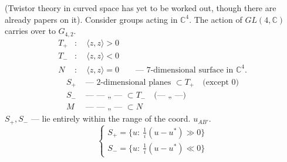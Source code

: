 (Twistor theory in curved space has yet to be worked out, though there are already papers on it).
Consider groups acting in \(\mathbb C^4\).
The action of \(GL(4,\mathbb C)\) carries over to \(G_{4,2}\).
\[
\begin{aligned}
T_+&:\quad\langle z,z\rangle>0\\
T_-&:\quad\langle z,z\rangle<0\\
N&:\quad\langle z,z\rangle=0\qquad\text{— 7-dimensional surface in }\mathbb C^4.
\end{aligned}
\]
\[
\begin{aligned}
S_+&\text{ — 2-dimensional planes }\subset T_+\quad\text{(except 0)}\\
S_-&\text{ — — „ — }\subset T_-\quad\text{(— „ —)}\\
M&\text{ — — „ — }\subset N
\end{aligned}
\]
\(S_+,S_-\) — lie entirely within the range of the coord. \(u_{AB'}\).
\[
\begin{cases}
S_+=\{u:\ \frac{1}{i}(u-u^*)\gg0\}\\
S_-=\{u:\ \frac{1}{i}(u-u^*)\ll0\}
\end{cases}\tag{17}
\]


